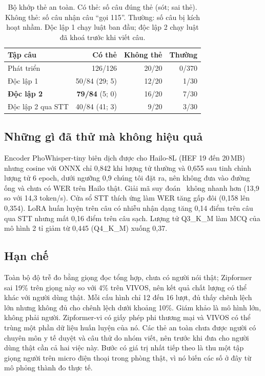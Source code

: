 \documentclass[a4paper,12pt,twocolumn]{article}
\begin{document}
\begin{table}[t]\centering\small
\caption{Bộ khớp thẻ an toàn. Có thẻ: số câu đúng thẻ (sót; sai thẻ). Không thẻ: số câu nhận câu ``gọi 115''. Thường: số câu bị kích hoạt nhầm. Độc lập 1 chạy luật ban đầu; độc lập 2 chạy luật đã khoá trước khi viết câu.}\label{tab:safety}
\setlength{\tabcolsep}{1.5pt}
\begin{tabular}{@{}lrrr@{}}\toprule
Tập câu & Có thẻ & Không thẻ & Thường\\\midrule
Phát triển & 126/126 & 20/20 & 0/370\\
Độc lập 1 & 50/84 (29; 5) & 12/20 & 1/30\\
\textbf{Độc lập 2} & \textbf{79/84} (5; 0) & 16/20 & 7/30\\
Độc lập 2 qua STT & 40/84 (41; 3) & 9/20 & 3/30\\\bottomrule
\end{tabular}
\end{table}

\subsection{Những gì đã thử mà không hiệu quả}\label{sec:negative}
Encoder PhoWhisper-tiny biên dịch được cho Hailo-8L (HEF 19 đến 20\,MB) nhưng cosine với ONNX chỉ 0,842 khi lượng tử thường và 0,655 sau tinh chỉnh lượng tử 6 epoch, dưới ngưỡng 0,9 chúng tôi đặt ra, nên không đưa vào đường ống và chưa có WER trên Hailo thật. Giải mã suy đoán~\cite{speculative} không nhanh hơn (13,9 so với 14,3 token/s). Cửa sổ STT thích ứng làm WER tăng gấp đôi (0,158 lên 0,354). LoRA huấn luyện trên câu có nhiễu nhận dạng tăng 0,14 điểm trên câu qua STT nhưng mất 0,16 điểm trên câu sạch. Lượng tử Q3\_K\_M làm MCQ của mô hình 2 tỉ giảm từ 0,445 (Q4\_K\_M) xuống 0,37.

\subsection{Hạn chế}
Toàn bộ độ trễ đo bằng giọng đọc tổng hợp, chưa có người nói thật; Zipformer sai 19\% trên giọng này so với 4\% trên VIVOS, nên kết quả chất lượng có thể khác với người dùng thật. Mỗi cấu hình chỉ 12 đến 16 lượt, đủ thấy chênh lệch lớn nhưng không đủ cho chênh lệch dưới khoảng 10\%. Giám khảo là mô hình lớn, không phải người. Zipformer-vi có giấy phép phi thương mại và VIVOS có thể trùng một phần dữ liệu huấn luyện của nó. Các thẻ an toàn chưa được người có chuyên môn y tế duyệt và câu thử do nhóm viết, nên trước khi đưa cho người dùng thật cần cả hai việc này. Bước có giá trị nhất tiếp theo là thu một tập giọng người trên micro điện thoại trong phòng thật, vì nó biến các số ở đây từ mô phỏng thành đo thực tế.
\end{document}
